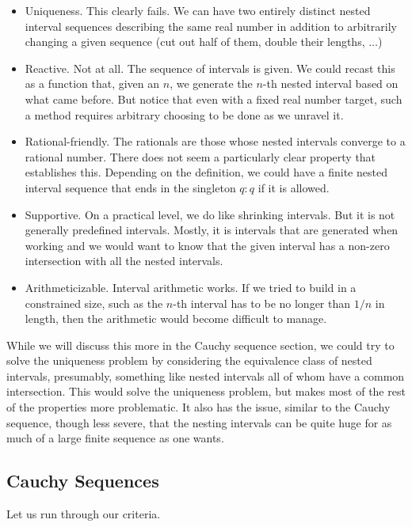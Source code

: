 \documentclass[12pt]{article}
\theoremstyle{remark}
\begin{document}
\begin{itemize}
    \item Uniqueness. This clearly fails. We can have two entirely distinct nested interval sequences describing the same real number in addition to arbitrarily changing a given sequence (cut out half of them, double their lengths, ...)
    \item Reactive. Not at all. The sequence of intervals is given. We could recast this as a function that, given an $n$, we generate the $n$-th nested interval based on what came before. But notice that even with a fixed real number target, such a method requires arbitrary choosing to be done as we unravel it.
    \item Rational-friendly. The rationals are those whose nested intervals converge to a rational number. There does not seem a particularly clear property that establishes this. Depending on the definition, we could have a finite nested interval sequence that ends in the singleton $q:q$ if it is allowed. 
    \item Supportive. On a practical level, we do like shrinking intervals. But it is not generally predefined intervals. Mostly, it is intervals that are generated when working and we would want to know that the given interval has a non-zero intersection with all the nested intervals. 
    \item Arithmeticizable. Interval arithmetic works. If we tried to build in a constrained size, such as the $n$-th interval has to be no longer than $1/n$ in length, then the arithmetic would become difficult to manage.  
\end{itemize}

While we will discuss this more in the Cauchy sequence section, we could try to solve the uniqueness problem by considering the equivalence class of nested intervals, presumably, something like nested intervals all of whom have a common intersection. This would solve the uniqueness problem, but makes most of the rest of the properties more problematic. It also has the issue, similar to the Cauchy sequence, though less severe, that the nesting intervals can be quite huge for as much of a large finite sequence as one wants. 


\subsection{Cauchy Sequences}

Let us run through our criteria. 
\end{document}
